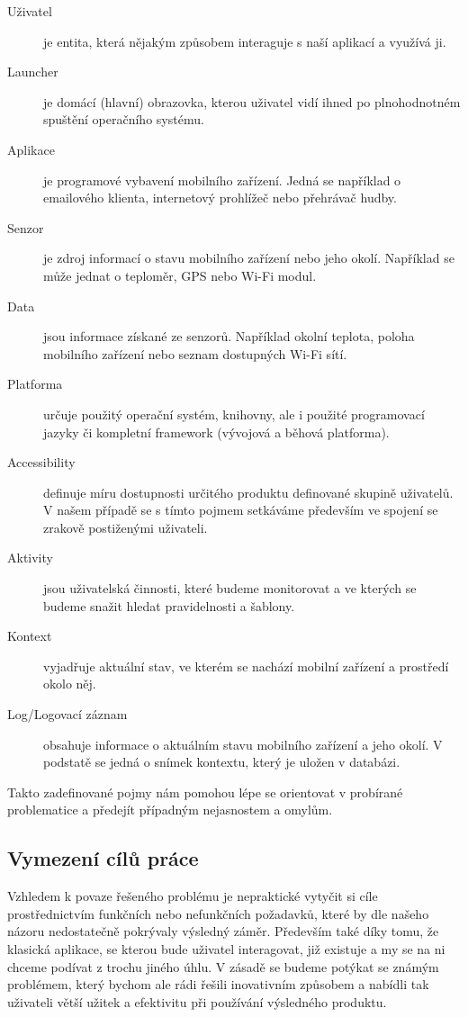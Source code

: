 \documentclass[thesis=M,czech]{FITthesis}[2012/06/26]
\begin{document}
\begin{introduction}
\begin{description}
\item[Uživatel] je entita, která nějakým způsobem interaguje s naší aplikací a využívá ji.
\item[Launcher] je domácí (hlavní) obrazovka, kterou uživatel vidí ihned po plnohodnotném spuštění operačního systému.\cite{launcher}
\item[Aplikace] je programové vybavení mobilního zařízení. Jedná se například o emailového klienta, internetový prohlížeč nebo přehrávač hudby.
\item[Senzor] je zdroj informací o stavu mobilního zařízení nebo jeho okolí. Například se může jednat o teploměr, GPS nebo Wi-Fi modul.
\item[Data] jsou informace získané ze senzorů. Například okolní teplota, poloha mobilního zařízení nebo seznam dostupných Wi-Fi sítí.
\item[Platforma] určuje použitý operační systém, knihovny, ale i použité programovací jazyky či kompletní framework (vývojová a běhová platforma).\cite{platform}
\item[Accessibility] definuje míru dostupnosti určitého produktu definované skupině uživatelů. V našem případě se s tímto pojmem setkáváme především ve spojení se zrakově postiženými uživateli.
\item[Aktivity] jsou uživatelská činnosti, které budeme monitorovat a ve kterých se budeme snažit hledat pravidelnosti a šablony.
\item[Kontext] vyjadřuje aktuální stav, ve kterém se nachází mobilní zařízení a prostředí okolo něj.
\item[Log/Logovací záznam] obsahuje informace o aktuálním stavu mobilního zařízení a jeho okolí. V podstatě se jedná o snímek kontextu, který je uložen v databázi.
\end{description}

Takto zadefinované pojmy nám pomohou lépe se orientovat v probírané problematice a předejít případným nejasnostem a omylům.

\subsection{Vymezení cílů práce}
Vzhledem k povaze řešeného problému je nepraktické vytyčit si cíle prostřednictvím funkčních nebo nefunkčních požadavků, které by dle našeho názoru nedostatečně pokrývaly výsledný záměr. Především také díky tomu, že klasická aplikace, se kterou bude uživatel interagovat, již existuje a my se na ni chceme podívat z trochu jiného úhlu. V zásadě se budeme potýkat se známým problémem, který bychom ale rádi řešili inovativním způsobem a nabídli tak uživateli větší užitek a efektivitu při používání výsledného produktu.


\end{introduction}
\end{document}
